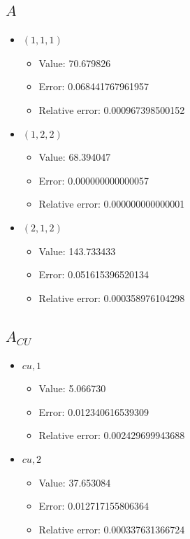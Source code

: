 \documentclass{article}%
\begin{document}
\subsection{$A$}%
\begin{itemize}%
	\item $(1, 1, 1)$%
	\begin{itemize}%
		\item Value: 70.679826%
		\item Error: 0.068441767961957%
		\item Relative error: 0.000967398500152%
	\end{itemize}%
	\item $(1, 2, 2)$%
	\begin{itemize}%
		\item Value: 68.394047%
		\item Error: 0.000000000000057%
		\item Relative error: 0.000000000000001%
	\end{itemize}%
	\item $(2, 1, 2)$%
	\begin{itemize}%
		\item Value: 143.733433%
		\item Error: 0.051615396520134%
		\item Relative error: 0.000358976104298%
	\end{itemize}%
\end{itemize}%
\subsection{$A_{CU}$}%
\begin{itemize}%
	\item $\textit{cu},1$%
	\begin{itemize}%
		\item Value: 5.066730%
		\item Error: 0.012340616539309%
		\item Relative error: 0.002429699943688%
	\end{itemize}%
	\item $\textit{cu},2$%
	\begin{itemize}%
		\item Value: 37.653084%
		\item Error: 0.012717155806364%
		\item Relative error: 0.000337631366724%
	\end{itemize}%
\end{itemize}%
\end{document}
